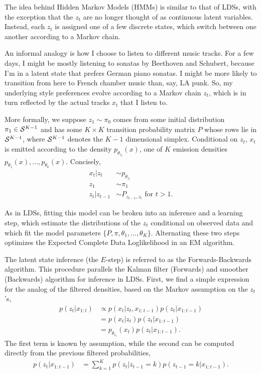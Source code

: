 \documentclass{article}
\begin{document}
The idea behind Hidden Markov Models (HMMs) is similar to that of LDSs, with the
exception that the $z_{t}$ are no longer thought of as continuous latent
variables. Instead, each $z_{t}$ is assigned one of a few discrete states,
which switch between one another according to a Markov chain.

An informal analogy is how I choose to listen to different music tracks. For a
few days, I might be mostly listening to sonatas by Beethoven and Schubert,
because I'm in a latent state that prefers German piano sonatas. I might be more
likely to transition from here to French chamber music than, say, LA punk. So,
my underlying style preferences evolve according to a Markov chain $z_{t}$,
which is in turn reflected by the actual tracks $x_{t}$ that I listen to.

More formally, we suppose $z_{1} \sim \pi_{0}$ comes from some initial
distribution $\pi_{1} \in \mathcal{S}^{K - 1}$ and has some $K \times K$ transition
probability matrix $P$ whose rows lie in $\mathcal{S}^{K - 1}$, where $\mathcal{S}^{K
  - 1}$ denotes the $K - 1$ dimensional simplex. Conditional on $z_{t}$, $x_{t}$
is emitted according to the density $p_{\theta_{z_{t}}}\left(x\right)$, one of
$K$ emission densities $p_{\theta_{1}}\left(x\right), \dots,
p_{\theta_{k}}\left(x\right)$. Concisely,
\begin{align*}
  x_{t} \vert z_{t} &\sim p_{\theta_{z_{t}}} \\
  z_{1} &\sim \pi_{1} \\
  z_{t} \vert z_{t - 1} &\sim P_{z_{t - 1}, z_{t}} \text{ for } t > 1.
\end{align*}

As in LDSs, fitting this model can be broken into an inference and a learning
step, which estimate the distributions of the $z_{t}$ conditional on observed
data and which fit the model parameters $\{P, \pi, \theta_{1}, \dots,
\theta_{K}\}$. Alternating these two steps optimizes the Expected Complete Data
Loglikelihood in an EM algorithm.

The latent state inference (the $E$-step) is referred to as the
Forwards-Backwards algorithm. This procedure parallels the Kalman filter
(Forwards) and smoother (Backwards) algorithm for inference in LDSs. First,
we find a simple expression for the analog of the filtered densities, based on
the Markov assumption on the $z_{t}$'s,
\begin{align*}
  p\left(z_{t} \vert x_{1:t}\right) &\propto p\left(x_{t} \vert z_{t}, x_{1:t - 1}\right) p\left(z_{t} \vert x_{1:t - 1}\right) \\
  &= p\left(x_{t} \vert z_{t}\right) p\left(z_{t} \vert x_{1:t - 1}\right) \\
  &= p_{\theta_{z_{t}}}\left(x_{t}\right)p\left(z_{t} \vert x_{1:t - 1}\right).
\end{align*}
The first term is known by assumption, while the second can be computed directly
from the previous filtered probabilities,
\begin{align*}
  p\left(z_{t} \vert x_{1:t - 1}\right) &= \sum_{k = 1}^{K} p\left(z_{t} \vert z_{t - 1} = k\right)p\left(z_{t - 1} = k \vert x_{1:t - 1} \right).
\end{align*}
\end{document}

